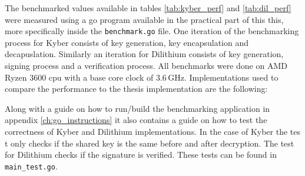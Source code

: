 The benchmarked values available in tables \ref{tab:kyber_perf} and \ref{tab:dil_perf} were measured using a go program available in the practical part of this this, more specifically inside the \texttt{benchmark.go} file. One iteration of the benchmarking process for Kyber consists of key generation, key encapsulation and decapuslation. Similarly an iteration for Dilithium consists of key generation, signing process and a verification process. All benchmarks were done on AMD Ryzen 3600 cpu with a base core clock of 3.6\,GHz. Implementations used to compare the performance to the thesis implementation are the following:
\begin{itemize}
\end{itemize}

Along with a guide on how to run/build the benchmarking application in appendix \ref{ch:go_instructions} it also contains a guide on how to test the correctness of Kyber and Dilithium implementations. In the case of Kyber the tes t only checks if the shared key is the same before and after decryption. The test for Dilithium checks if the signature is verified. These tests can be found in \texttt{main\_test.go}.

